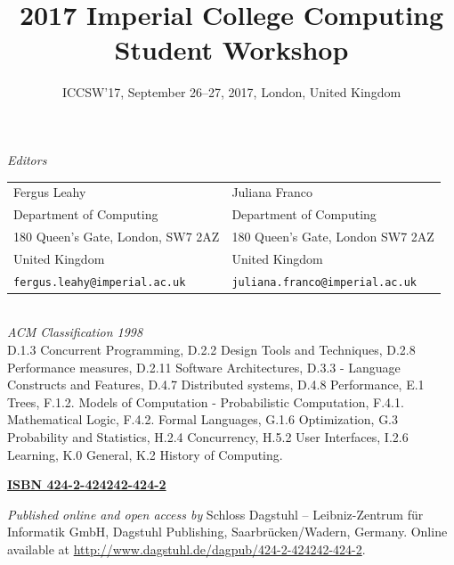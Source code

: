 \documentclass[a4paper,UKenglish]{oasicsmaster-v2016}
\title{\huge 2017 Imperial College Computing Student Workshop}
\subtitle{ICCSW'17, September 26--27, 2017, London, United Kingdom}
\newcommand{\VolumeISBN}{424-2-424242-424-2}
\begin{document}
\frontmatter


\maketitle


\begin{publicationinfo}%
\sffamily

\emph{Editors} \\[0.2cm]
\begin{tabular}{ll}
Fergus Leahy              &   Juliana Franco   \\
Department of Computing                  & Department of Computing \\
180 Queen's Gate, London, SW7 2AZ        & 180 Queen's Gate, London SW7 2AZ \\
United Kingdom                           & United Kingdom \\
\texttt{fergus.leahy@imperial.ac.uk} &  \texttt{juliana.franco@imperial.ac.uk}
\end{tabular}
\ \\

\bigskip
\bigskip
\bigskip
\bigskip
\emph{ACM Classification 1998}\\
D.1.3 Concurrent Programming, 
D.2.2 Design Tools and Techniques, 
D.2.8 Performance measures, 
D.2.11 Software Architectures,
D.3.3 - Language Constructs and Features, 
D.4.7 Distributed systems, D.4.8 Performance, 
E.1 Trees,
F.1.2. Models of Computation - Probabilistic Computation, 
F.4.1. Mathematical Logic, 
F.4.2. Formal Languages, 
G.1.6 Optimization,  
G.3 Probability and Statistics, 
H.2.4 Concurrency, 
H.5.2 User Interfaces, 
I.2.6 Learning, 
K.0 General, 
K.2 History of Computing.

\bigskip
\bigskip

{\Large\bf\sffamily \href{http://www.dagstuhl.de/dagpub/\VolumeISBN}{ISBN \VolumeISBN}}

\bigskip
\bigskip

\emph{Published online and open access by}\newline
Schloss Dagstuhl -- Leibniz-Zentrum f\"ur Informatik GmbH, Dagstuhl Publishing, Saarbr\"ucken/Wadern, Germany. Online available at \href{http://www.dagstuhl.de/dagpub/\VolumeISBN}{http://www.dagstuhl.de/dagpub/\VolumeISBN}.


\end{publicationinfo}
\end{document}
